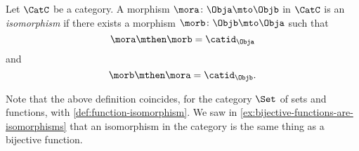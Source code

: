 \begin{definition}\label{def:isomorphism-in-any-cat}
    Let $\CatC$ be a category.
    A morphism $\mora \colon \Obja \mto \Objb$ in $\CatC$ is an \emph{isomorphism} if there exists a morphism $\morb \colon \Objb \mto \Obja$ such that
    \begin{equation}
        \mora \mthen \morb = \catid_\Obja
    \end{equation}
    and
    \begin{equation}
        \morb \mthen \mora = \catid_\Objb.
    \end{equation}
\end{definition}

\begin{remark}
    Note that the above definition coincides, for the category $\Set$ of sets and functions, with \cref{def:function-isomorphism}.
    We saw in \cref{ex:bijective-functions-are-isomorphisms} that an isomorphism in the category \Set is the same thing as a bijective function.
\end{remark}


